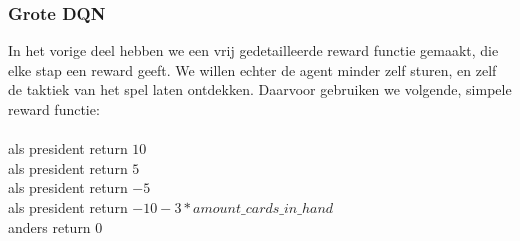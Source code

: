\documentclass[11pt]{article}
\begin{document}
\subsubsection{Grote DQN}
In het vorige deel hebben we een vrij gedetailleerde reward functie gemaakt, die elke stap een reward geeft. We willen echter de agent minder zelf sturen, en zelf de taktiek van het spel laten ontdekken. Daarvoor gebruiken we volgende, simpele reward functie:\\\\
\indent als president return $10$\\
\indent als president return $5$\\
\indent als president return $-5$\\
\indent als president return $-10 - 3*amount\_cards\_in\_hand$\\
\indent anders return 0\\
\end{document}
